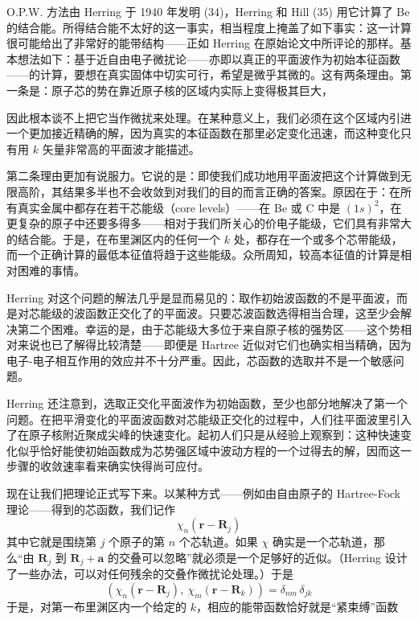 O.P.W. 方法由 Herring 于 1940 年发明 (34)，Herring 和 Hill (35) 用它计算了 Be 的结合能。所得结合能不太好的这一事实，相当程度上掩盖了如下事实：这一计算很可能给出了非常好的能带结构——正如 Herring 在原始论文中所评论的那样。基本想法如下：基于近自由电子微扰论——亦即以真正的平面波作为初始本征函数——的计算，要想在真实固体中切实可行，希望是微乎其微的。这有两条理由。第一条是：原子芯的势在靠近原子核的区域内实际上变得极其巨大，

因此根本谈不上把它当作微扰来处理。在某种意义上，我们必须在这个区域内引进一个更加接近精确的解，因为真实的本征函数在那里必定变化迅速，而这种变化只有用 $k$ 矢量非常高的平面波才能描述。

第二条理由更加有说服力。它说的是：即使我们成功地用平面波把这个计算做到无限高阶，其结果多半也不会收敛到对我们的目的而言正确的答案。原因在于：在所有真实金属中都存在若干芯能级（core levels）——在 Be 或 C 中是 $(1s)^2$，在更复杂的原子中还要多得多——相对于我们所关心的价电子能级，它们具有非常大的结合能。于是，在布里渊区内的任何一个 $k$ 处，都存在一个或多个芯带能级，而一个正确计算的最低本征值将趋于这些能级。众所周知，较高本征值的计算是相对困难的事情。

Herring 对这个问题的解法几乎是显而易见的：取作初始波函数的不是平面波，而是对芯能级的波函数正交化了的平面波。只要芯波函数选得相当合理，这至少会解决第二个困难。幸运的是，由于芯能级大多位于来自原子核的强势区——这个势相对来说也已了解得比较清楚——即便是 Hartree 近似对它们也确实相当精确，因为电子-电子相互作用的效应并不十分严重。因此，芯函数的选取并不是一个敏感问题。

Herring 还注意到，选取正交化平面波作为初始函数，至少也部分地解决了第一个问题。在把平滑变化的平面波函数对芯能级正交化的过程中，人们往平面波里引入了在原子核附近聚成尖峰的快速变化。起初人们只是从经验上观察到：这种快速变化似乎恰好能使初始函数成为芯势强区域中波动方程的一个过得去的解，因而这一步骤的收敛速率看来确实快得尚可应付。

现在让我们把理论正式写下来。以某种方式——例如由自由原子的 Hartree-Fock 理论——得到的芯函数，我们记作
\begin{equation*}
\chi_n(\mathbf{r}-\mathbf{R}_j)
\end{equation*}
其中它就是围绕第 $j$ 个原子的第 $n$ 个芯轨道。如果 $\chi$ 确实是一个芯轨道，那么“由 $\mathbf{R}_j$ 到 $\mathbf{R}_j+\mathbf{a}$ 的交叠可以忽略”就必须是一个足够好的近似。（Herring 设计了一些办法，可以对任何残余的交叠作微扰论处理。）于是
\begin{equation*}
\left(\chi_n(\mathbf{r}-\mathbf{R}_j),\ \chi_m(\mathbf{r}-\mathbf{R}_k)\right)=\delta_{nm}\,\delta_{jk}\tag{13}
\end{equation*}
于是，对第一布里渊区内一个给定的 $k$，相应的能带函数恰好就是“紧束缚”函数

